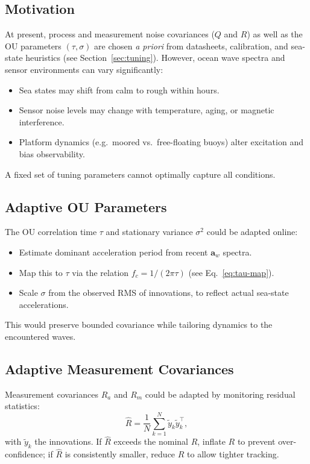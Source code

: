 \documentclass[10pt]{extarticle}
\begin{document}
\subsection{Motivation}
At present, process and measurement noise covariances ($Q$ and $R$) as well as
the OU parameters $(\tau,\sigma)$ are chosen \emph{a priori} from datasheets,
calibration, and sea-state heuristics (see Section~\ref{sec:tuning}).
However, ocean wave spectra and sensor environments can vary significantly:
\begin{itemize}
\item Sea states may shift from calm to rough within hours.
\item Sensor noise levels may change with temperature, aging, or magnetic interference.
\item Platform dynamics (e.g.\ moored vs.\ free-floating buoys) alter excitation and bias observability.
\end{itemize}
A fixed set of tuning parameters cannot optimally capture all conditions.

\subsection{Adaptive OU Parameters}
The OU correlation time $\tau$ and stationary variance $\sigma^2$ could be adapted online:
\begin{itemize}
\item Estimate dominant acceleration period from recent $\bm a_w$ spectra.
\item Map this to $\tau$ via the relation $f_c = 1/(2\pi\tau)$ (see Eq.~\ref{eq:tau-map}).
\item Scale $\sigma$ from the observed RMS of innovations, to reflect actual sea-state accelerations.
\end{itemize}
This would preserve bounded covariance while tailoring dynamics to the encountered waves.

\subsection{Adaptive Measurement Covariances}
Measurement covariances $R_a$ and $R_m$ could be adapted by monitoring residual statistics:
\begin{equation}
\hat R = \frac{1}{N}\sum_{k=1}^N \tilde y_k \tilde y_k^\top,
\end{equation}
with $\tilde y_k$ the innovations. If $\hat R$ exceeds the nominal $R$, inflate $R$ to
prevent over-confidence; if $\hat R$ is consistently smaller, reduce $R$ to allow tighter tracking.
\end{document}

